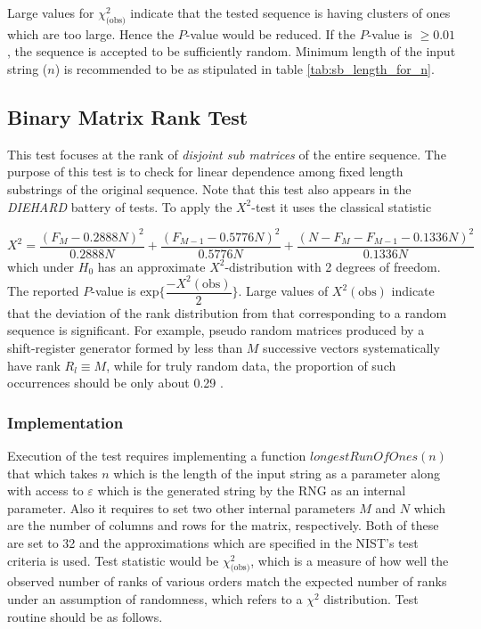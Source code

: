 Large values for $\chi^2_{\text{(obs)}}$ indicate that the tested sequence is having clusters of ones which are too large. Hence the $P$-value would be reduced. If the $P$-value is $\geq 0.01$, the sequence is accepted to be sufficiently random. Minimum length of the input string ($n$) is recommended to be as stipulated in table \ref{tab:sb_length_for_n}.

\subsection{Binary Matrix Rank Test}

This test focuses at the rank of \textit{disjoint sub matrices} of the entire sequence. The purpose of this test is to check for linear dependence among fixed length substrings of the original sequence. Note that this test also appears in the \textit{DIEHARD} battery of tests. To apply the $X^2$-test it uses the classical statistic

\[
    X^2 = \dfrac{(F_M  - 0.2888N)^2}{0.2888N} + \dfrac{(F_{M-1}  - 0.5776N)^2}{0.5776N} + \dfrac{(N - F_M - F_{M-1}  - 0.1336N)^2}{0.1336N}
\]
which under $H_0$ has an approximate $X^2$-distribution with 2 degrees of freedom. The reported $P$-value is $\text{exp}\bigg\{\dfrac{-X^2(\text{obs})}{2}\bigg\}$. Large values of $X^2(\text{obs})$ indicate that the deviation of the rank distribution from that corresponding to a random sequence is significant. For example, pseudo random matrices produced by a shift-register generator formed by less than $M$ successive vectors systematically have rank $R_l \equiv M$, while for truly random data, the proportion of such occurrences should be only about 0.29 \cite{rep_nist_sp_80022}.

\subsubsection{Implementation}

Execution of the test requires implementing a function $longestRunOfOnes(n)$ that which takes $n$ which is the length of the input string as a parameter along with access to $\varepsilon$ which is the generated string by the RNG as an internal parameter. Also it requires to set two other internal parameters $M$ and $N$ which are the number of columns and rows for the matrix, respectively. Both of these are set to 32 and the approximations which are specified in the NIST's test criteria is used. Test statistic would be $\chi^2_\text{(obs)}$, which is a measure of how well the observed number of ranks of various orders match the expected number of ranks under an assumption of randomness, which refers to a $\chi^2$ distribution. Test routine should be as follows.

